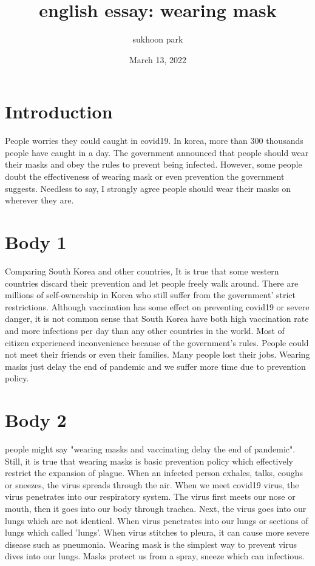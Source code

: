 \documentclass{article}
\begin{document}
\title{english essay: wearing mask}
\author{sukhoon park}
\date{March 13, 2022}

\maketitle

\section{Introduction}
 People worries they could caught in covid19. In korea, more than 300 thousands people have caught in a day. The government announced that people should wear their masks and obey the rules to prevent being infected. However, some people doubt the effectiveness of wearing mask or even prevention the government suggests. Needless to say, I strongly agree people should wear their masks on wherever they are. \\

\section{Body 1}
 Comparing South Korea and other countries,  It is true that some western countries discard their prevention and let people freely walk around. There are millions of self-ownership in Korea who still suffer from the government' strict restrictions. Although vaccination has some effect on preventing covid19 or severe danger, it is not common sense that South Korea have both high vaccination rate and more infections per day than any other countries in the world. Most of citizen experienced inconvenience because of the government's rules. People could not meet their friends or even their families. Many people lost their jobs. Wearing masks just delay the end of pandemic and we suffer more time due to prevention policy.

\section{Body 2}
people might say "wearing masks and vaccinating delay the end of pandemic". Still, it is true that wearing masks is basic prevention policy which effectively restrict the expansion of plague. When an infected person exhales, talks, coughs or sneezes, the virus spreads through the air. When we meet covid19 virus, the virus penetrates into our respiratory system. The virus first meets our nose or mouth, then it goes into our body through trachea. Next, the virus goes into our lungs which are not identical. When virus penetrates into our lungs or sections of lungs which called 'lungs'. When virus stitches to pleura, it can cause more severe disease such as pneumonia. Wearing mask is the simplest way to prevent virus dives into our lungs. Masks protect us from a spray, sneeze which can infectious.
\end{document}
